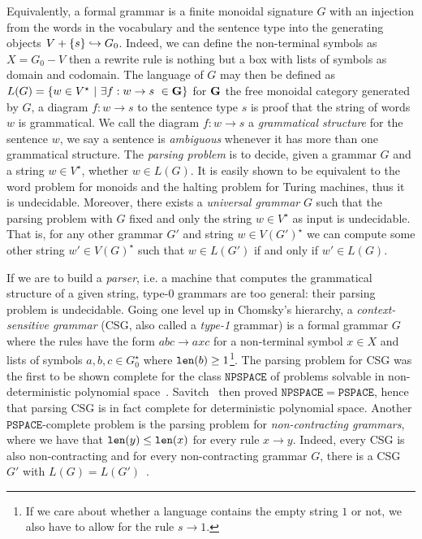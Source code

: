 Equivalently, a formal grammar is a finite monoidal signature $G$ with an injection from the words in the vocabulary and the sentence type into the generating objects $V + \{ s \} \hookrightarrow G_0$.
Indeed, we can define the non-terminal symbols as $X = G_0 - V$ then a rewrite rule is nothing but a box with lists of symbols as domain and codomain.
The language of $G$ may then be defined as $L(G) = \{ w \in V^\star \ \vert \ \exists f : w \to s \ \in \mathbf{G} \}$ for $\mathbf{G}$ the free monoidal category generated by $G$, a diagram $f : w \to s$ to the sentence type $s$ is proof that the string of words $w$ is grammatical.
We call the diagram $f : w \to s$ a \emph{grammatical structure} for the sentence $w$, we say a sentence is \emph{ambiguous} whenever it has more than one grammatical structure.
The \emph{parsing problem} is to decide, given a grammar $G$ and a string $w \in V^\star$, whether $w \in L(G)$.
It is easily shown to be equivalent to the word problem for monoids and the halting problem for Turing machines, thus it is undecidable.
Moreover, there exists a \emph{universal grammar} $G$ such that the parsing problem with $G$ fixed and only the string $w \in V^\star$ as input is undecidable.
That is, for any other grammar $G'$ and string $w \in V(G')^\star$ we can compute some other string $w' \in V(G)^\star$ such that $w \in L(G')$ if and only if $w' \in L(G)$.

If we are to build a \emph{parser}, i.e. a machine that computes the grammatical structure of a given string, type-0 grammars are too general: their parsing problem is undecidable.
Going one level up in Chomsky's hierarchy, a \emph{context-sensitive grammar} (CSG, also called a \emph{type-1} grammar) is a formal grammar $G$ where the rules have the form $a b c \to a x c$ for a non-terminal symbol $x \in X$ and lists of symbols $a, b, c \in G_0^\star$ where $\mathtt{len}(b) \geq 1$\footnote
{If we care about whether a language contains the empty string $1$ or not, we also have to allow for the rule $s \to 1$.}.
The parsing problem for CSG was the first to be shown complete for the class $\mathtt{NPSPACE}$ of problems solvable in non-deterministic polynomial space~\cite{Kuroda64}.
Savitch~\cite{Savitch70} then proved $\mathtt{NPSPACE} = \mathtt{PSPACE}$, hence that parsing CSG is in fact complete for deterministic polynomial space.
Another $\mathtt{PSPACE}$-complete problem is the parsing problem for \emph{non-contracting grammars}, where we have that $\mathtt{len}(y) \leq \mathtt{len}(x)$ for every rule $x \to y$.
Indeed, every CSG is also non-contracting and for every non-contracting grammar $G$, there is a CSG $G'$ with $L(G) = L(G')$~\cite[Theorem~11]{Chomsky63}.

